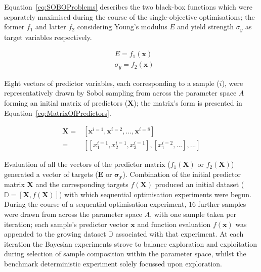 Equation~\ref{eq:SOBOProblems} describes the two black-box functions which
 were separately maximised during the course of the single-objective
 optimisations; the former \(f_{1}\) and latter \(f_{2}\) considering
 Young's modulus \(E\) and yield strength \(\sigma_{y}\) as target variables
 respectively.

\begin{equation}\label{eq:SOBOProblems}
    \begin{split}
        &E=f_{1}(\mathbf{x})\\
        &\sigma_{y}=f_{2}(\mathbf{x})
    \end{split}
\end{equation}

Eight vectors of predictor variables, each corresponding to a sample (\(i\)),
 were representatively drawn by Sobol sampling from across the parameter
 space \(A\) forming an initial matrix of predictors (\(\mathbf{X}\)); the
 matrix's form is presented in Equation~\ref{eq:MatrixOfPredictors}.

\begin{equation}\label{eq:MatrixOfPredictors}
    \begin{split}
        \mathbf{X}=&[\mathbf{x}^{i=1},\mathbf{x}^{i=2},...,\mathbf{x}^{i=8}]\\
        =&[[x_{1}^{i=1},x_{2}^{i=1},x_{3}^{i=1}],[x_{1}^{i=2},...],...]
    \end{split}
\end{equation}

Evaluation of all the vectors of the predictor matrix (\(f_{1}(\mathbf{X})\)
 or \(f_{2}(\mathbf{X})\)) generated a vector of targets (\(\mathbf{E}\) or
 \(\bm{\sigma_{y}}\)).
Combination of the initial predictor matrix \(\mathbf{X}\) and the
 corresponding targets \(f(\mathbf{X})\) produced an initial dataset
 (\(\mathbb{D}=[\mathbf{X},f(\mathbf{X})]\)) with which sequential
 optimisation experiments were begun.
During the course of a sequential optimisation experiment, 16 further samples
 were drawn from across the parameter space \(A\), with one sample taken per
 iteration; each sample's predictor vector \(\mathbf{x}\) and function
 evaluation \(f(\mathbf{x})\) was appended to the growing dataset
 \(\mathbb{D}\) associated with that experiment.
At each iteration the Bayesian experiments strove to balance exploration and
 exploitation during selection of sample composition within the parameter
 space, whilst the benchmark deterministic experiment solely focussed upon
 exploration.
 
